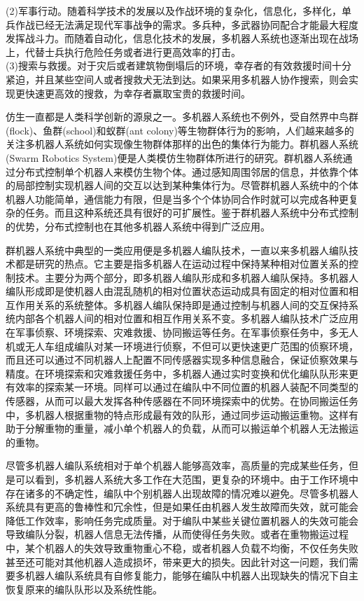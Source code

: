 	(2)军事行动。随着科学技术的发展以及作战环境的复杂化，信息化，多样化，单兵作战已经无法满足现代军事战争的需求。多兵种，多武器协同配合才能最大程度发挥战斗力。而随着自动化，信息化技术的发展，多机器人系统也逐渐出现在战场上，代替士兵执行危险任务或者进行更高效率的打击。\\
	
	(3)搜索与救援。对于灾后或者建筑物倒塌后的环境，幸存者的有效救援时间十分紧迫，并且某些空间人或者搜救犬无法到达。如果采用多机器人协作搜索，则会实现更快速更高效的搜救，为幸存者赢取宝贵的救援时间。
	
仿生一直都是人类科学创新的源泉之一。多机器人系统也不例外，受自然界中鸟群(flock)、鱼群(school)和蚁群(ant colony)等生物群体行为的影响\supercite{stilwell1993toward,theraulaz1991task,reif1999social,balch2000social,couceiro2011novel}，人们越来越多的关注多机器人系统如何实现像生物群体那样的出色的集体行为能力。群机器人系统(Swarm Robotics System)便是人类模仿生物群体所进行的研究。群机器人系统通过分布式控制单个机器人来模仿生物个体。通过感知周围邻居的信息，并依靠个体的局部控制实现机器人间的交互以达到某种集体行为。尽管群机器人系统中的个体机器人功能简单，通信能力有限，但是当多个个体协同合作时就可以完成各种更复杂的任务。而且这种系统还具有很好的可扩展性。鉴于群机器人系统中分布式控制的优势，分布式控制也在其他多机器人系统中得到广泛应用。
	
群机器人系统中典型的一类应用便是多机器人编队技术，一直以来多机器人编队技术都是研究的热点。它主要是指多机器人在运动过程中保持某种相对位置关系的控制技术。主要分为两个部分，即多机器人编队形成和多机器人编队保持。多机器人编队形成即是使机器人由混乱随机的相对位置状态运动成具有固定的相对位置和相互作用关系的系统整体。多机器人编队保持即是通过控制与机器人间的交互保持系统内部各个机器人间的相对位置和相互作用关系不变。多机器人编队技术广泛应用在军事侦察、环境探索、灾难救援、协同搬运等任务。在军事侦察任务中，多无人机或无人车组成编队对某一环境进行侦察，不但可以更快速更广范围的侦察环境，而且还可以通过不同机器人上配置不同传感器实现多种信息融合，保证侦察效果与精度。在环境探索和灾难救援任务中，多机器人通过实时变换和优化编队队形来更有效率的探索某一环境。同样可以通过在编队中不同位置的机器人装配不同类型的传感器，从而可以最大发挥各种传感器在不同环境探索中的优势。在协同搬运任务中，多机器人根据重物的特点形成最有效的队形，通过同步运动搬运重物。这样有助于分解重物的重量，减小单个机器人的负载，从而可以搬运单个机器人无法搬运的重物。

尽管多机器人编队系统相对于单个机器人能够高效率，高质量的完成某些任务，但是可以看到，多机器人系统大多工作在大范围，更复杂的环境中。由于工作环境中存在诸多的不确定性，编队中个别机器人出现故障的情况难以避免。尽管多机器人系统具有更高的鲁棒性和冗余性，但是如果任由机器人发生故障而失效，就可能会降低工作效率，影响任务完成质量。对于编队中某些关键位置机器人的失效可能会导致编队分裂，机器人信息无法传播，从而使得任务失败。或者在重物搬运过程中，某个机器人的失效导致重物重心不稳，或者机器人负载不均衡，不仅任务失败甚至还可能对其他机器人造成损坏，带来更大的损失。因此针对这一问题，我们需要多机器人编队系统具有自修复能力，能够在编队中机器人出现缺失的情况下自主恢复原来的编队队形以及系统性能。

